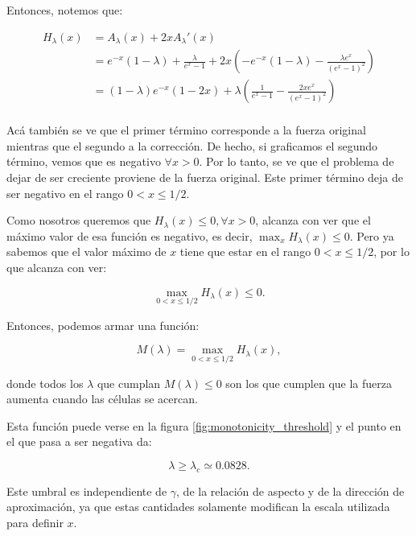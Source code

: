 \documentclass[11pt,a4paper]{article}
\begin{document}
Entonces, notemos que:

\begin{equation}
	\begin{split}
		H_{\lambda}(x)
		&= A_{\lambda}(x)
		+2xA_{\lambda}'(x) \\
		&=e^{-x}(1-\lambda)
		+
		\frac{\lambda}
		{e^{x}-1} +2x\left(-e^{-x}(1-\lambda)
		-
		\frac{\lambda e^{x}}
		{(e^{x}-1)^{2}}\right)\\
		&=(1-\lambda)e^{-x}(1-2x)+ \lambda \left(\frac{1}{e^{x}-1}-\frac{2xe^{x}}{(e^{x}-1)^{2}}\right)\\
	\end{split}
\end{equation}

Acá también se ve que el primer término corresponde a la fuerza original mientras que el segundo a la corrección. De hecho, si graficamos el segundo término, vemos que es negativo $\forall x>0$. Por lo tanto, se ve que el problema de dejar de ser creciente proviene de la fuerza original. Este primer término deja de ser negativo en el rango $0<x\leq1/2$.

Como nosotros queremos que $H_{\lambda}(x) \leq 0, \forall x>0$, alcanza con ver que el máximo valor de esa función es negativo, es decir, $\max_{x} H_{\lambda}(x) \leq 0$. Pero ya sabemos que el valor máximo de $x$ tiene que estar en el rango $0<x\leq1/2$, por lo que alcanza con ver:

\begin{equation}
\max_{0<x\leq1/2}
H_{\lambda}(x)
\leq0.
\end{equation}

Entonces, podemos armar una función:

\begin{equation}
	M({\lambda})=\max_{0<x\leq1/2}
	H_{\lambda}(x),
\end{equation}

donde todos los $\lambda$ que cumplan $M(\lambda) \leq 0$ son los que cumplen que la fuerza aumenta cuando las células se acercan.

Esta función puede verse en la figura \ref{fig:monotonicity_threshold} y el punto en el que pasa a ser negativa da:

\begin{equation}
\boxed{
\lambda
\geq
\lambda_c
\simeq
0.0828
}.
\label{eq:lambda_critical}
\end{equation}

Este umbral es independiente de $\gamma$, de la relación de aspecto y de la dirección de aproximación, ya que estas cantidades solamente modifican la escala utilizada para definir $x$.
\end{document}
